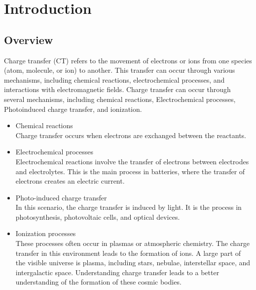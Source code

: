 \setcounter{chapter}{0}
\chapter{Introduction}

\label{introduction}
 
\section{Overview}

Charge transfer (CT) refers to the movement of electrons or ions from one species (atom, molecule, or ion) to another. This transfer can occur through various mechanisms, including chemical reactions, electrochemical processes, and interactions with electromagnetic fields. Charge transfer can occur through several mechanisms, including chemical reactions, Electrochemical processes, Photoinduced charge transfer, and ionization.

\begin{itemize}
\item{Chemical reactions}\\
  Charge transfer occurs when electrons are exchanged between the reactants.
\item{Electrochemical processes}\\
  Electrochemical reactions involve the transfer of electrons between electrodes and electrolytes. This is the main process in batteries, where the transfer of electrons creates an electric current.
\item{Photo-induced charge transfer}\\
  In this scenario, the charge transfer is induced by light. It is the process in photosynthesis, photovoltaic cells, and optical devices.
\item{Ionization processes}\\
  These processes often occur in plasmas or atmospheric chemistry. The charge transfer in this environment leads to the formation of ions. A large part of the visible universe is plasma, including stars, nebulae, interstellar space, and intergalactic space. Understanding charge transfer leads to a better understanding of the formation of these cosmic bodies.
\end{itemize}

